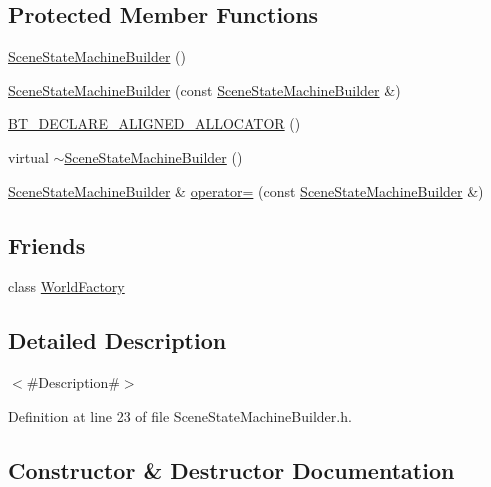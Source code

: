 \subsection*{Protected Member Functions}
\begin{DoxyCompactItemize}
\item 
\mbox{\hyperlink{classnjli_1_1_scene_state_machine_builder_a71d8ef4d4414baa4b6606d4c50a44c35}{Scene\+State\+Machine\+Builder}} ()
\item 
\mbox{\hyperlink{classnjli_1_1_scene_state_machine_builder_a0a51d5c4c70f41044dee451b1b0c39c7}{Scene\+State\+Machine\+Builder}} (const \mbox{\hyperlink{classnjli_1_1_scene_state_machine_builder}{Scene\+State\+Machine\+Builder}} \&)
\item 
\mbox{\hyperlink{classnjli_1_1_scene_state_machine_builder_ab73b21033ac0ce8ccd949a445cc9518c}{B\+T\+\_\+\+D\+E\+C\+L\+A\+R\+E\+\_\+\+A\+L\+I\+G\+N\+E\+D\+\_\+\+A\+L\+L\+O\+C\+A\+T\+OR}} ()
\item 
virtual \mbox{\hyperlink{classnjli_1_1_scene_state_machine_builder_a7492e20e8f9a4a3ff84c8226889d882d}{$\sim$\+Scene\+State\+Machine\+Builder}} ()
\item 
\mbox{\hyperlink{classnjli_1_1_scene_state_machine_builder}{Scene\+State\+Machine\+Builder}} \& \mbox{\hyperlink{classnjli_1_1_scene_state_machine_builder_a74adb973afa0ffe2ed7da2c033d10134}{operator=}} (const \mbox{\hyperlink{classnjli_1_1_scene_state_machine_builder}{Scene\+State\+Machine\+Builder}} \&)
\end{DoxyCompactItemize}
\subsection*{Friends}
\begin{DoxyCompactItemize}
\item 
class \mbox{\hyperlink{classnjli_1_1_scene_state_machine_builder_acb96ebb09abe8f2a37a915a842babfac}{World\+Factory}}
\end{DoxyCompactItemize}


\subsection{Detailed Description}
$<$\#\+Description\#$>$ 

Definition at line 23 of file Scene\+State\+Machine\+Builder.\+h.



\subsection{Constructor \& Destructor Documentation}
\mbox{\label{classnjli_1_1_scene_state_machine_builder_a71d8ef4d4414baa4b6606d4c50a44c35}} 
